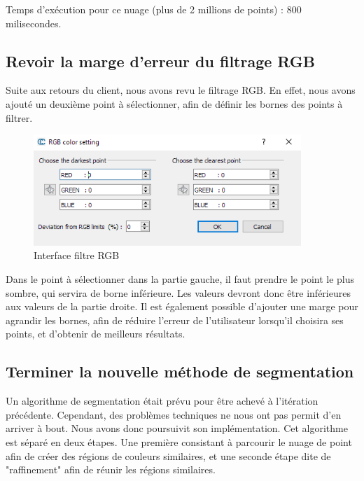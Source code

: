 \documentclass[12pt,titlepage,french]{article}
\begin{document}
Temps d'exécution pour ce nuage (plus de 2 millions de points) : 800 milisecondes.

\subsection{Revoir la marge d'erreur du filtrage RGB}

Suite aux retours du client, nous avons revu le filtrage RGB. En effet, nous avons ajouté un deuxième point à sélectionner, afin de définir les bornes des points à filtrer.

\begin{figure}[H]
 \caption{\label{} Interface filtre RGB}
 \begin{center}
 \includegraphics[width=0.9\textwidth]{./img/ui_filter_rgb.PNG}
  \end{center}
\end{figure}

Dans le point à sélectionner dans la partie gauche, il faut prendre le point le plus sombre, qui servira de borne inférieure. Les valeurs devront donc être inférieures aux valeurs de la partie droite. Il est également possible d'ajouter une marge pour agrandir les bornes, afin de réduire l'erreur de l'utilisateur lorsqu'il choisira ses points, et d'obtenir de meilleurs résultats.

\subsection{Terminer la nouvelle méthode de segmentation}

Un algorithme de segmentation était prévu pour être achevé à l'itération précédente. Cependant, des problèmes techniques ne nous ont pas permit d'en arriver à bout. Nous avons donc poursuivit son implémentation. Cet algorithme est séparé en deux étapes. Une première consistant à parcourir le nuage de point afin de créer des régions de couleurs similaires, et une seconde étape dite de "raffinement" afin de réunir les régions similaires. \newline
\end{document}
